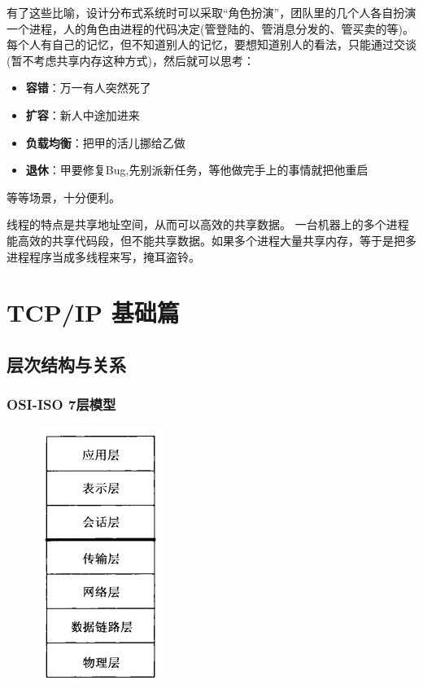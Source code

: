 \documentclass[UTF8,a4paper,12pt]{ctexbook}
\begin{document}
 	 有了这些比喻，设计分布式系统时可以采取“角色扮演”，团队里的几个人各自扮演一个进程，人的角色由进程的代码决定(管登陆的、管消息分发的、管买卖的等)。每个人有自己的记忆，但不知道别人的记忆，要想知道别人的看法，只能通过交谈(暂不考虑共享内存这种方式)，然后就可以思考：
 	 
	 	\begin{itemize}
		 	\item \textbf{容错}：万一有人突然死了
		 	\item \textbf{扩容}：新人中途加进来
		 	\item \textbf{负载均衡}：把甲的活儿挪给乙做
		 	\item \textbf{退休}：甲要修复Bug,先别派新任务，等他做完手上的事情就把他重启
	 	\end{itemize} 	
	 等等场景，十分便利。
	 
	 线程的特点是共享地址空间，从而可以高效的共享数据。 一台机器上的多个进程能高效的共享代码段，但不能共享数据。如果多个进程大量共享内存，等于是把多进程程序当成多线程来写，掩耳盗铃。		 	

\chapter{TCP/IP 基础篇}    

	\section{层次结构与关系}	
		\subsection{OSI-ISO 7层模型}
				\begin{figure}[h]
					\centering
					\includegraphics[scale = 0.8]{figures/OSI-Model.png}
				\end{figure}
			
\end{document}
